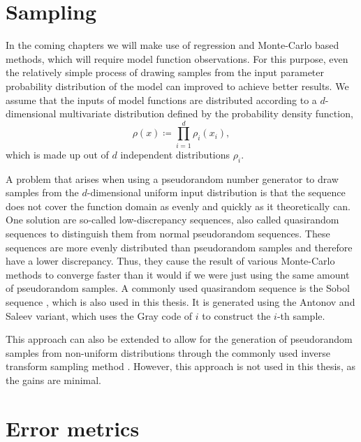 \documentclass[
  a4paper,  %
  twoside,  %
  bibliography=totoc,
  headsepline,
  cleardoublepage=empty,
  parskip=half,
  draft=false
]{scrbook}
\begin{document}
\section{Sampling}
\label{sec:lds}

In the coming chapters we will make use of regression and Monte-Carlo based methods, which will require model function observations.
For this purpose, even the relatively simple process of drawing samples from the input parameter probability distribution of the model can improved to achieve better results.
We assume that the inputs of model functions are distributed according to a $d$-dimensional multivariate distribution defined by the probability density function,
\begin{equation}
\rho(x) \coloneqq \prod_{i=1}^d \rho_i(x_i),
\end{equation}
which is made up out of $d$ independent distributions $\rho_i$.

A problem that arises when using a pseudorandom number generator to draw samples from the $d$-dimensional uniform input distribution is that the sequence does not cover the function domain as evenly and quickly as it theoretically can.
One solution are so-called low-discrepancy sequences, also called quasirandom sequences to distinguish them from normal pseudorandom sequences.
These sequences are more evenly distributed than pseudorandom samples and therefore have a lower discrepancy.
Thus, they cause the result of various Monte-Carlo methods to converge faster than it would if we were just using the same amount of pseudorandom samples.
A commonly used quasirandom sequence is the Sobol sequence \cite{Niederreiter1988}, which is also used in this thesis.
It is generated using the Antonov and Saleev variant, which uses the Gray code of $i$ to construct the $i$-th sample.

This approach can also be extended to allow for the generation of pseudorandom samples from non-uniform distributions through the commonly used inverse transform sampling method \cite{Devroye1986}.
However, this approach is not used in this thesis, as the gains are minimal.

\section{Error metrics}
\label{sec:errors}
\end{document}
